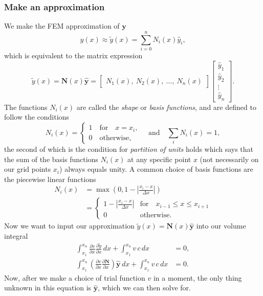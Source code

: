 \documentclass[acmtog]{acmart}
\begin{document}
\subsubsection{Make an approximation}
We make the FEM approximation of $\boldsymbol y$
%
\begin{equation}
  y(x) \approx \tilde y(x) = \sum_{i=0}^n N_i(x) \hat{y}_i,
\end{equation}
%
which is equivalent to the matrix expression
%
\begin{equation}
  \tilde{y}(x) = \boldsymbol N(x) \boldsymbol{ \hat{y}} =\begin{bmatrix}
    N_1(x), \ N_2(x), \ \dots, \ N_n(x)
  \end{bmatrix} \begin{bmatrix}
    \hat{y}_1 \\
    \hat{y}_2 \\
    \vdots    \\
    \hat{y}_n
  \end{bmatrix}.
\end{equation}
%
The functions $N_i(x)$ are called the \textit{shape} or \textit{basis
  functions}, and are defined to follow the conditions
%
\begin{equation}
  N_i(x) = \begin{cases}
    1 \quad \text{for} \quad x= x_i, \\
    0 \quad \text{otherwise},
  \end{cases} \quad \mathrm{and} \quad \sum_i N_i(x) = 1,
\end{equation}
%
the second of which is the condition for \textit{partition of units} holds
which says that the sum of the basis functions $N_i(x)$ at any specific point
$x$ (not necessarily on our grid points $x_i$) always equals unity. A common
choice of basis functions are the piecewise linear functions
%
\begin{align}
  N_i (x) & = \max\left( 0, 1- \left\lvert  \frac{x_i - x}{\Delta x}  \right\rvert \right)                                       \\
          & = \begin{cases}
                \displaystyle1- \left\lvert  \frac{x_i - x}{\Delta x}  \right\rvert & \text{for} \quad x_{i-1} \leq x \leq x_{i+1} \\
                0                                                                   & \mathrm{otherwise.}
              \end{cases}
\end{align}
%
Now we want to input our approximation $\tilde{y}(x) = \boldsymbol N(x)
  \boldsymbol{\hat{y}}$ into our volume integral
%
\begin{align}
  \int_{x_1}^{x_n} \frac{ \partial v }{ \partial x } \frac{ \partial \tilde{y} }{ \partial x } \, dx + \int_{x_1}^{x_n} v \, c \, dx                                         & = 0, \\
  \int_{x_1}^{x_n} \left( \frac{ \partial v }{ \partial x } \frac{ \partial \boldsymbol N}{ \partial x } \right) \boldsymbol {\hat{y}} \, dx + \int_{x_1}^{x_n} v \, c \, dx & = 0.
\end{align}
%
Now, after we make a choice of trial function $v$ in a moment, the only thing
unknown in this equation is $\boldsymbol{\hat{y}}$, which we can then solve
for.
\end{document}
